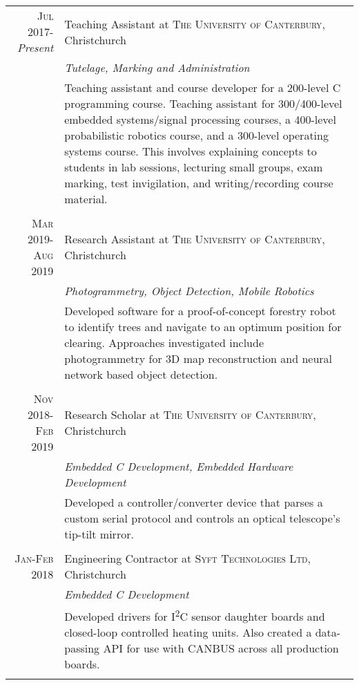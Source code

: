 \documentclass[a4paper,10pt]{article} %
\begin{document}
\begin{tabular}{r|p{11cm}}

\textsc{Jul 2017}-\emph{Present} & Teaching Assistant at \textsc{The University of Canterbury}, Christchurch \\
& \emph{Tutelage, Marking and Administration} \\
& \footnotesize{Teaching assistant and course developer for a 200-level C programming course. Teaching assistant for 300/400-level embedded systems/signal processing courses, a 400-level probabilistic robotics course, and a 300-level operating systems course. This involves explaining concepts to students in lab sessions, lecturing small groups, exam marking, test invigilation, and writing/recording course material. } \\
\multicolumn{2}{c}{} \\


\textsc{Mar 2019-Aug 2019} & Research Assistant at \textsc{The University of Canterbury}, Christchurch \\
& \emph{Photogrammetry, Object Detection, Mobile Robotics}\\
& \footnotesize{Developed software for a proof-of-concept forestry robot to identify trees and navigate to an optimum position for clearing. Approaches investigated include photogrammetry for 3D map reconstruction and neural network based object detection. }\\
\multicolumn{2}{c}{} \\


\textsc{Nov 2018-Feb 2019} & Research Scholar at \textsc{The University of Canterbury}, Christchurch \\
& \emph{Embedded C Development, Embedded Hardware Development}\\
& \footnotesize{Developed a controller/converter device that parses a custom serial protocol and controls an optical telescope's tip-tilt mirror. }\\
\multicolumn{2}{c}{} \\


\textsc{Jan-Feb 2018} & Engineering Contractor at \textsc{Syft Technologies Ltd}, Christchurch \\
& \emph{Embedded C Development}\\
& \footnotesize{Developed drivers for I\textsuperscript{2}C sensor daughter boards and closed-loop controlled heating units. Also created a data-passing API for use with CANBUS across all production boards. }\\
\multicolumn{2}{c}{} \\


\end{tabular}
\end{document}
